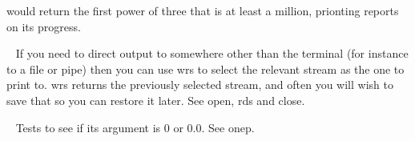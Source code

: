 \begin{description}
\noindent would return the first power of three that is at least a million,
prionting reports on its progress.
\item[{\tx wrs~~~~~~~~~~} \hspace{1cm} {\em function 1 arg}]~\newline
If you need to direct output to somewhere other than the terminal (for instance
to a file or pipe) then you can use {\tx wrs} to select the relevant stream as
the one to print to. {\tx wrs} returns the previously selected stream, and
often you will wish to save that so you can restore it later. See {\tx open},
{\tx rds} and {\tx close}.
\item[{\tx zerop~~~~~~~~} \hspace{1cm} {\em function 1 arg}]~\newline
Tests to see if its argument is 0 or 0.0. See {\tx onep}.
\end{description}
